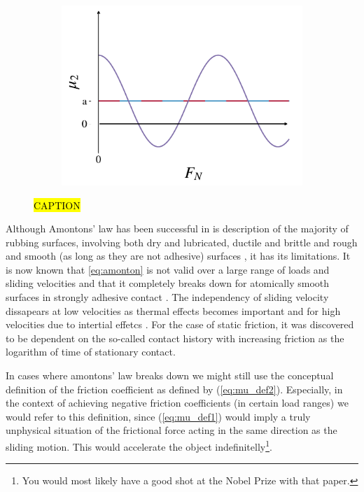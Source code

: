 \begin{figure}[H]
\begin{subfigure}[t]{0.32\textwidth}
      \caption{}
  \end{subfigure}
  \hfill
  \begin{subfigure}[t]{0.32\textwidth}
      \centering
      \includegraphics[width=\textwidth]{figures/theory/fric_coef_example_c.pdf}
      \caption{}
  \end{subfigure}
  \hfill
  \caption{\hl{CAPTION}}
  \label{fig:fric_coef_example}
\end{figure}


Although Amontons' law has been successful in is description of the majority of
rubbing surfaces, involving both dry and lubricated, ductile and brittle and
rough and smooth (as long as they are not adhesive) surfaces \cite{gao_frictional_2004},
it has its limitations. It is now known that \cref{eq:amonton} is not valid
over a large range of loads and sliding velocities and that it completely breaks
down for atomically smooth surfaces in strongly adhesive contact
\cite{gao_frictional_2004}. The independency of sliding velocity dissapears at
low velocities as thermal effects becomes important and for high velocities due
to intertial effetcs \cite[pp. 5-6]{gnecco_meyer_2015}. For the case of static
friction, it was discovered to be dependent on the so-called contact
history with increasing friction as the logarithm of time of stationary contact.

In cases where amontons' law breaks down we might still use the conceptual
definition of the friction coefficient as defined by (\cref{eq:mu_def2}).
Especially, in the context of achieving negative friction coefficients (in certain load ranges) we would refer to this definition, since (\cref{eq:mu_def1}) would imply a truly unphysical situation of the frictional force acting in the same direction as the sliding motion. This would accelerate the object indefinitelly\footnote{You would most likely have a good shot at the Nobel Prize with that paper.}.

